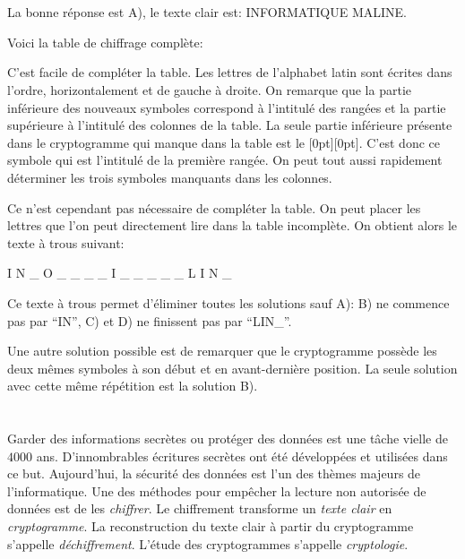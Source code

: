 {{%
\section*{\BrochureSolution}
La bonne réponse est A), le texte clair est: INFORMATIQUE MALINE.

Voici la table de chiffrage complète:

{\centering%
\par}

C’est facile de compléter la table. Les lettres de l’alphabet latin sont écrites dans l’ordre, horizontalement et de gauche à droite. On remarque que la partie inférieure des nouveaux symboles correspond à l’intitulé des rangées et la partie supérieure à l’intitulé des colonnes de la table. La seule partie inférieure présente dans le cryptogramme qui manque dans la table est le \raisebox{-0.5ex}[0pt][0pt]{}. C’est donc ce symbole qui est l’intitulé de la première rangée. On peut tout aussi rapidement déterminer les trois symboles manquants dans les colonnes.

Ce n’est cependant pas nécessaire de compléter la table. On peut placer les lettres que l’on peut directement lire dans la table incomplète. On obtient alors le texte à trous suivant:

I N \_ O \_ \_ \_ \_ I \_ \_ \_ \_ \_ L I N \_

Ce texte à trous permet d’éliminer toutes les solutions sauf A): B) ne commence pas par “IN”, C) et D) ne finissent pas par “LIN\_”.

Une autre solution possible est de remarquer que le cryptogramme possède les deux mêmes symboles à son début et en avant-dernière position. La seule solution avec cette même répétition est la solution B).



\section*{\BrochureItsInformatics}
Garder des informations secrètes ou protéger des données est une tâche vielle de $4000$ ans. D’innombrables écritures secrètes ont été développées et utilisées dans ce but. Aujourd’hui, la sécurité des données est l’un des thèmes majeurs de l’informatique. Une des méthodes pour empêcher la lecture non autorisée de données est de les \emph{chiffrer}. Le chiffrement transforme un \emph{texte clair} en \emph{cryptogramme}. La reconstruction du texte clair à partir du cryptogramme s’appelle \emph{déchiffrement}. L’étude des cryptogrammes s’appelle \emph{cryptologie}.

}}
